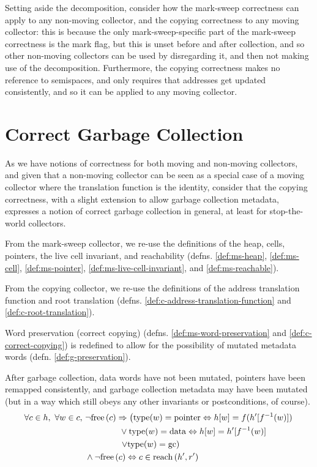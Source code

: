Setting aside the decomposition, consider how the mark-sweep
correctness can apply to any non-moving collector, and the copying
correctness to any moving collector: this is because the only
mark-sweep-specific part of the mark-sweep correctness is the mark
flag, but this is unset before and after collection, and so other
non-moving collectors can be used by disregarding it, and then not
making use of the decomposition. Furthermore, the copying correctness
makes no reference to semispaces, and only requires that addresses get
updated consistently, and so it can be applied to any moving
collector.

\section{Correct Garbage Collection}
\label{sec:gc-correct}

As we have notions of correctness for both moving and non-moving
collectors, and given that a non-moving collector can be seen as a
special case of a moving collector where the translation function is
the identity, consider that the copying correctness, with a slight
extension to allow garbage collection metadata, expresses a notion of
correct garbage collection in general, at least for stop-the-world
collectors.

From the mark-sweep collector, we re-use the definitions of the heap,
cells, pointers, the live cell invariant, and reachability
(defns. \ref{def:ms-heap}, \ref{def:ms-cell}, \ref{def:ms-pointer},
\ref{def:ms-live-cell-invariant}, and \ref{def:ms-reachable}).

From the copying collector, we re-use the definitions of the address
translation function and root translation
(defns. \ref{def:c-address-translation-function} and
\ref{def:c-root-translation}).

Word preservation (correct copying)
(defns. \ref{def:ms-word-preservation} and
\ref{def:c-correct-copying}) is redefined to allow for the possibility
of mutated metadata words (defn. \ref{def:g-preservation}).

\begin{definition}[Preservation]
  \label{def:g-preservation}
  After garbage collection, data words have not been mutated, pointers
  have been remapped consistently, and garbage collection metadata may
  have been mutated (but in a way which still obeys any other
  invariants or postconditions, of course).
  \begin{align*}
    \forall c \in h,\ \forall w \in c,\ &\lnot\mathrm{free}\left(c\right) \Rightarrow
    \left(\mathrm{type}(w) = \mathrm{pointer} \Leftrightarrow h[w] = f(h'[f^{-1}(w)])\right.\\
    &\quad\quad\quad\quad \lor \mathrm{type}(w) = \mathrm{data}
    \Leftrightarrow h[w] = h'[f^{-1}(w)]\\
    &\quad\quad\quad\quad \left.\lor \mathrm{type}(w) = \mathrm{gc}\right)\\
    &\land \lnot\mathrm{free}\left(c\right) \Leftrightarrow c \in \mathrm{reach}\left(h', r'\right)
  \end{align*}
\end{definition}

